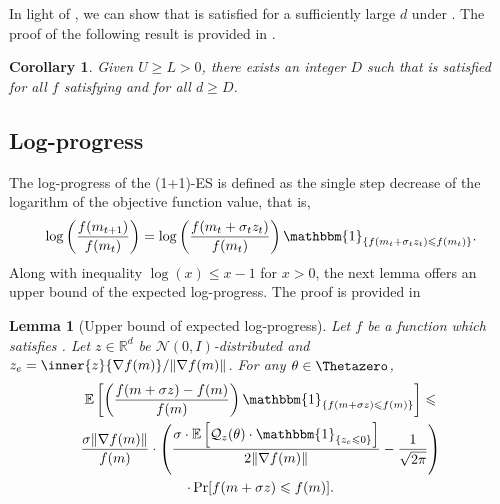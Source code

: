\documentclass[journal]{IEEEtran}
\providecommand{\R}{\mathbb{R}} %
\providecommand{\E}{\mathbb{E}} %
\providecommand{\ind}[1]{\ensuremath{\mathbbm{1}_{\left\{#1\right\}}}} %
\renewcommand{\geq}{\geqslant} %
\renewcommand{\leq}{\leqslant} %
\DeclarePairedDelimiter{\norm}{\lVert}{\rVert}
\newtheorem{corollary}[theorem]{Corollary}
\newtheorem{lemma}[theorem]{Lemma}
\theoremstyle{definition}
\newcommand{\mori}[1]{{\color[rgb]{0.22, 0.71, 0.55} MORINAGA :  #1}}
\begin{document}
In light of , we can show that  is satisfied for a sufficiently large $d$ under . The proof of the following result is provided in .
\begin{corollary}\label{cor:tr_cond}
Given $U \geq L > 0$, there exists an integer $D$ such that  is satisfied for all $f$ satisfying  and for all $d \geq D$. 
\end{corollary}



\subsection{Log-progress}

The log-progress of the (1+1)-ES is defined as the single step decrease of the logarithm of the objective function value, that is,
\begin{equation}
\log\left(\frac{f(m_{t+1})}{f(m_t)}\right) = \log\left( \frac{ f(m_t + \sigma_t z_t)}{ f(m_t) } \right) \ind{f(m_t + \sigma_t z_t) \leq f(m_t)}.
\end{equation}
Along with inequality $\log(x) \leq x - 1$ for $x > 0$, the next lemma offers an upper bound of the expected log-progress.
The proof is provided in 
\begin{lemma}[Upper bound of expected log-progress]\label{lemma:qualitygain}
Let $f$ be a function which satisfies . Let $z \in \R^d$ be $\mathcal{N}(0, I)$-distributed and $z_e = \inner{z}{\nabla f(m)}/\norm{\nabla f(m)}$.
For any $\theta\in\Thetazero$,
\begin{multline}
\E\left[\left( \frac{ f(m + \sigma z) - f(m) }{ f(m) } \right) \ind{f(m + \sigma z) \leq f(m)}\right]
\leq \\
\frac{\sigma \norm{\nabla f(m)}}{f(m)}\cdot\left(
\frac{\sigma \cdot \E\left[\mathcal{Q}_z(\theta)\cdot \ind{z_e\leq 0} \right] }{2\norm{\nabla f(m)}}
- \frac{1}{\sqrt{2\pi}}\right)
\\
\cdot \Pr[f(m + \sigma z) \leq f(m) ]
.
\label{eq:qualitygain}
\end{multline}
\end{lemma}
\end{document}
